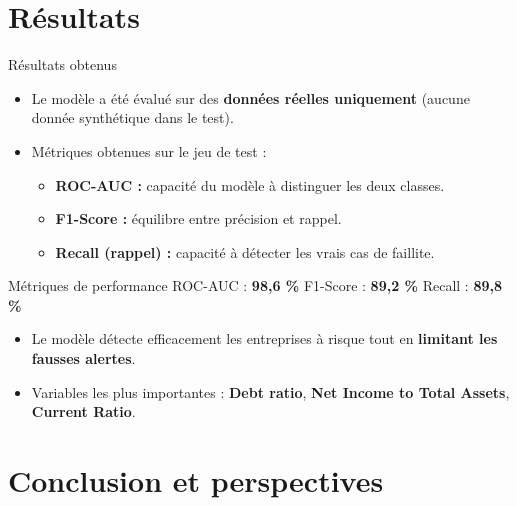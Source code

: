 \documentclass[10pt,aspectratio=169]{beamer}
\begin{document}
\section{Résultats}

\begin{frame}{Résultats obtenus}
  \begin{itemize}
    \item Le modèle a été évalué sur des \textbf{données réelles
          uniquement} (aucune donnée synthétique dans le test).
    \item Métriques obtenues sur le jeu de test :
      \begin{itemize}
        \item \textbf{ROC-AUC :} capacité du modèle à distinguer les deux
              classes.
        \item \textbf{F1-Score :} équilibre entre précision et rappel.
        \item \textbf{Recall (rappel) :} capacité à détecter les vrais cas
              de faillite.
      \end{itemize}
  \end{itemize}
  \begin{exampleblock}{Métriques de performance}
    \centering
    ROC-AUC : \textbf{98,6 \%} \quad
    F1-Score : \textbf{89,2 \%} \quad
    Recall : \textbf{89,8 \%}
  \end{exampleblock}
  \begin{itemize}
    \item Le modèle détecte efficacement les entreprises à risque tout en
          \textbf{limitant les fausses alertes}.
    \item Variables les plus importantes : \textbf{Debt ratio},
          \textbf{Net Income to Total Assets}, \textbf{Current Ratio}.
  \end{itemize}
\end{frame}

\section{Conclusion et perspectives}
\end{document}
